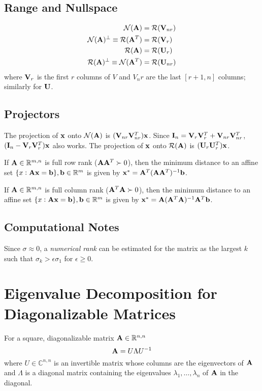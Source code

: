 \subsection*{Range and Nullspace}
\begin{align}
\mathcal{N}(\mathbf{A}) &= \mathcal{R}(\mathbf{V}_{nr})                      \\
\mathcal{N}(\mathbf{A})^\perp \equiv\mathcal{R}(\mathbf{A}^T)&=\mathcal{R}(\mathbf{V}_r) \\
\mathcal{R}(\mathbf{A})&=\mathcal{R}(\mathbf{U}_r)                        \\
\mathcal{R}(\mathbf{A})^\perp\equiv\mathcal{N}(\mathbf{A}^T)&=\mathcal{R}(\mathbf{U}_{nr})
\end{align}
where $\mathbf{V}_r$ is the first $r$ columns of $V$ and $V_nr$ are the last $[r+1,n]$ columns; similarly for $\mathbf{U}$.


\subsection*{Projectors}
The projection of $\mathbf{x}$ onto $\mathcal{N}(\mathbf{A})$ is $(\mathbf{V}_{nr}\mathbf{V}_{nr}^T)\mathbf{x}$. Since $\mathbf{I}_n=\mathbf{V}_r\mathbf{V}_r^T+\mathbf{V}_{nr}\mathbf{V}_{nr}^T$, $(\mathbf{I}_n-\mathbf{V}_{r}\mathbf{V}_{r}^T)\mathbf{x}$ also works. The projection of $\mathbf{x}$ onto $\mathcal{R}(\mathbf{A})$ is $(\mathbf{U}_r\mathbf{U}_r^T)\mathbf{x}$.

If $\mathbf{A}\in\mathbb{R}^{m,n}$ is full row rank ($\mathbf{A}\mathbf{A}^T\succ0$), then the minimum distance to an affine set $\{x:\mathbf{A}\mathbf{x}=\mathbf{b}\}, \mathbf{b}\in\mathbb{R}^{m}$ is given by $\mathbf{x}^*=\mathbf{A}^T(\mathbf{A}\mathbf{A}^T)^{-1}\mathbf{b}$. %

If $\mathbf{A}\in\mathbb{R}^{m,n}$ is full column rank ($\mathbf{A}^T\mathbf{A}\succ0$), then the minimum distance to an affine set $\{x:\mathbf{A}\mathbf{x}=\mathbf{b}\}, \mathbf{b}\in\mathbb{R}^{m}$ is given by $\mathbf{x}^*=\mathbf{A}(\mathbf{A}^T\mathbf{A})^{-1}\mathbf{A}^T\mathbf{b}$. %


\subsection*{Computational Notes}
Since $\sigma\approx0$, a \textit{numerical rank} can be estimated for the matrix as the largest $k$ such that $\sigma_k>\epsilon \sigma_1$ for $\epsilon\ge0$.



\section{Eigenvalue Decomposition for Diagonalizable Matrices}

For a square, diagonalizable matrix $\mathbf{A}\in\mathbb{R}^{n,n}$ 
\begin{equation}
\mathbf{A}=U\Lambda U^{-1}
\end{equation}
where $U\in\mathbb{C}^{n,n}$ is an invertible matrix whose columns are the eigenvectors of $\mathbf{A}$ and $\Lambda$ is a diagonal matrix containing the eigenvalues $\lambda_1,\ldots,\lambda_n$ of $\mathbf{A}$ in the diagonal.

